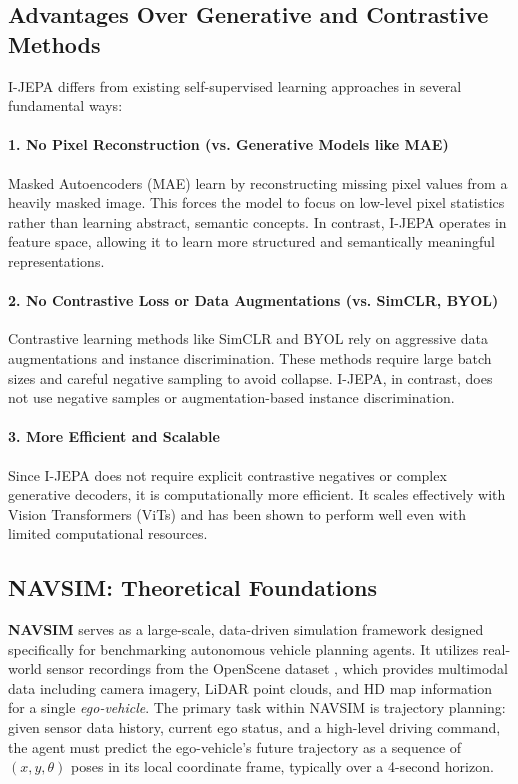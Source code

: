 \documentclass{article}
\begin{document}
\subsection{Advantages Over Generative and Contrastive Methods}
I-JEPA differs from existing self-supervised learning approaches in several fundamental ways:

\paragraph{1. No Pixel Reconstruction (vs. Generative Models like MAE)} Masked Autoencoders (MAE) \citep{he2022mae} learn by reconstructing missing pixel values from a heavily masked image. This forces the model to focus on low-level pixel statistics rather than learning abstract, semantic concepts. In contrast, I-JEPA operates in feature space, allowing it to learn more structured and semantically meaningful representations.

\paragraph{2. No Contrastive Loss or Data Augmentations (vs. SimCLR, BYOL)} Contrastive learning methods like SimCLR \citep{chen2020simple} and BYOL \citep{grill2020bootstrap} rely on aggressive data augmentations and instance discrimination. These methods require large batch sizes and careful negative sampling to avoid collapse. I-JEPA, in contrast, does not use negative samples or augmentation-based instance discrimination. 

\paragraph{3. More Efficient and Scalable} Since I-JEPA does not require explicit contrastive negatives or complex generative decoders, it is computationally more efficient. It scales effectively with Vision Transformers (ViTs) and has been shown to perform well even with limited computational resources. 

\subsection{NAVSIM: Theoretical Foundations}
\label{sec:navsim}
\textbf{NAVSIM} \cite{dauner2024navsim} serves as a large-scale, data-driven simulation framework designed specifically for benchmarking autonomous vehicle planning agents. It utilizes real-world sensor recordings from the OpenScene dataset \cite{OpenScene2023}, which provides multimodal data including camera imagery, LiDAR point clouds, and HD map information for a single \emph{ego-vehicle}. The primary task within NAVSIM is trajectory planning: given sensor data history, current ego status, and a high-level driving command, the agent must predict the ego-vehicle's future trajectory as a sequence of $(x, y, \theta)$ poses in its local coordinate frame, typically over a 4-second horizon.
\end{document}
